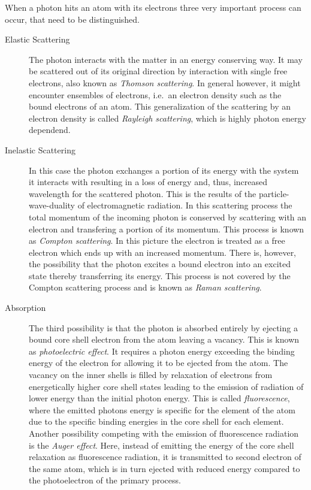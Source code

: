 When a photon hits an atom with its electrons three very important process can occur, that need to be distinguished.
\begin{description}
       \item[Elastic Scattering]
          {The photon interacts with the matter in an energy conserving way. It may be scattered out of its original direction by interaction with single free electrons, also known as \emph{Thomson scattering}. In general however, it might encounter ensembles of electrons, i.e.~an electron density such as the bound electrons of an atom. This generalization of the scattering by an electron density is called \emph{Rayleigh scattering}, which is highly photon energy dependend.}
       \item[Inelastic Scattering]
          {In this case the photon exchanges a portion of its energy with the system it interacts with resulting in a loss of energy and, thus, increased wavelength for the scattered photon. This is the results of the particle-wave-duality of electromagnetic radiation. In this scattering process the total momentum of the incoming photon is conserved by scattering with an electron and transfering a portion of its momentum. This process is known as \emph{Compton scattering}. In this picture the electron is treated as a free electron which ends up with an increased momentum. There is, however, the possibility that the photon excites a bound electron into an excited state thereby transferring its energy. This process is not covered by the Compton scattering process and is known as \emph{Raman scattering}.}
       \item[Absorption]
          {The third possibility is that the photon is absorbed entirely by ejecting a bound core shell electron from the atom leaving a vacancy. This is known as \emph{photoelectric effect}. It requires a photon energy exceeding the binding energy of the electron for allowing it to be ejected from the atom. The vacancy on the inner shells is filled by relaxation of electrons from energetically higher core shell states leading to the emission of radiation of lower energy than the initial photon energy. This is called \emph{fluorescence}, where the emitted photons energy is specific for the element of the atom due to the specific binding energies in the core shell for each element. Another possibility competing with the emission of fluorescence radiation is the \emph{Auger effect}. Here, instead of emitting the energy of the core shell relaxation as fluorescence radiation, it is transmitted to second electron of the same atom, which is in turn ejected with reduced energy compared to the photoelectron of the primary process.}
\end{description}


